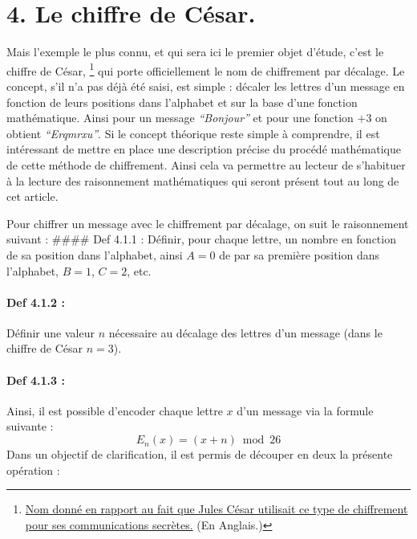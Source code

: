 \documentclass[
  paper=a4,
  ,captions=tableheading
]{scrartcl}
\begin{document}
\section{4. Le chiffre de César.}\label{le-chiffre-de-cuxe9sar.}

Mais l'exemple le plus connu, et qui sera ici le premier objet d'étude,
c'est le chiffre de César, \footnote{\href{https://sourcebooks.fordham.edu/ancient/suetonius-julius.asp}{Nom
  donné en rapport au fait que Jules César utilisait ce type de
  chiffrement pour ses communications secrètes.} (En Anglais.)} qui
porte officiellement le nom de chiffrement par décalage. Le concept,
s'il n'a pas déjà été saisi, est simple : décaler les lettres d'un
message en fonction de leurs positions dans l'alphabet et sur la base
d'une fonction mathématique. Ainsi pour un message \emph{``Bonjour''} et
pour une fonction \(+3\) on obtient \emph{``Erqmrxu''}. Si le concept
théorique reste simple à comprendre, il est intéressant de mettre en
place une description précise du procédé mathématique de cette méthode
de chiffrement. Ainsi cela va permettre au lecteur de s'habituer à la
lecture des raisonnement mathématiques qui seront présent tout au long
de cet article.

Pour chiffrer un message avec le chiffrement par décalage, on suit le
raisonnement suivant : \#\#\#\# Def 4.1.1 : Définir, pour chaque lettre,
un nombre en fonction de sa position dans l'alphabet, ainsi \(A = 0\) de
par sa première position dans l'alphabet, \(B = 1\), \(C = 2\), etc.

\paragraph{Def 4.1.2 :}\label{def-4.1.2}

Définir une valeur \(n\) nécessaire au décalage des lettres d'un message
(dans le chiffre de César \(n=3\)).

\paragraph{Def 4.1.3 :}\label{def-4.1.3}

Ainsi, il est possible d'encoder chaque lettre \(x\) d'un message via la
formule suivante : \[
E_n(x)=(x+n)\bmod26
\] Dans un objectif de clarification, il est permis de découper en deux
la présente opération :
\end{document}
